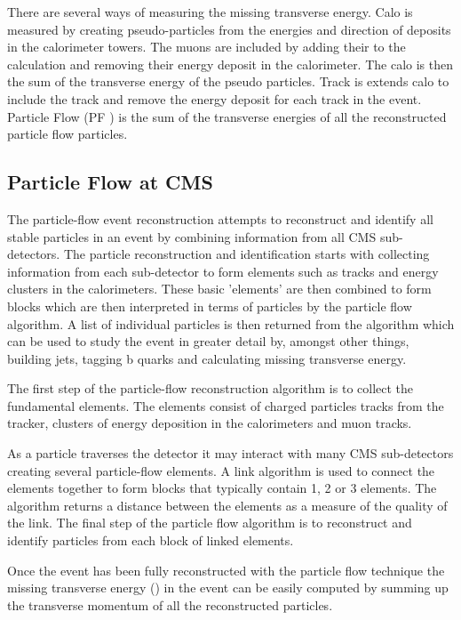 There are several ways of measuring the missing transverse energy.
Calo \ETm is measured by creating pseudo-particles from the energies and
direction of deposits in the calorimeter towers. The muons are included by
adding their \Pt to the calculation and removing their energy deposit in the
calorimeter. The calo \ETm is then the sum of the transverse energy of the
pseudo particles.
Track \ETm is extends calo \ETm to include the track \Pt and remove the energy
deposit for each track in the event.
Particle Flow \ETm (PF \ETm) is the sum of the transverse energies of all the
reconstructed particle flow particles.\cite{PF}

\subsection{Particle Flow at CMS}

The particle-flow event reconstruction attempts to reconstruct and identify all
stable particles in an event by combining information from all CMS
sub-detectors. The particle reconstruction and identification starts with
collecting information from each sub-detector to form elements such as tracks
and energy clusters in the calorimeters. These basic 'elements' are then
combined to form blocks which are then interpreted in terms of particles by the
particle flow algorithm. A list of individual particles is then returned from
the algorithm which can be used to study the event in greater detail by,
amongst other things, building jets, tagging b quarks and calculating missing
transverse energy.\cite{PF}

The first step of the particle-flow reconstruction algorithm is to collect the
fundamental elements. The elements consist of charged particles tracks from the
tracker, clusters of energy deposition in the calorimeters and muon tracks.

As a particle traverses the detector it may interact with many CMS sub-detectors
creating several particle-flow elements. A link algorithm is used to connect
the elements together to form blocks that typically contain 1, 2 or 3 elements.
The algorithm returns a distance between the elements as a measure of the
quality of the link. The final step of the particle flow algorithm is to
reconstruct and identify particles from each block of linked elements.\cite{PF}

Once the event has been fully reconstructed with the particle flow technique
the missing transverse energy (\ETm) in the event can be easily computed by
summing up the transverse momentum of all the reconstructed particles.\cite{PF}

